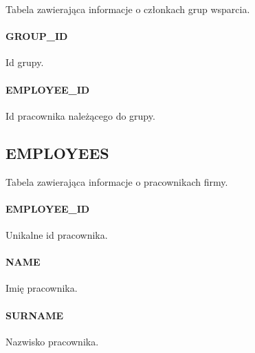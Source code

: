\documentclass[a4paper, oneside, 11pt]{report}
\begin{document}
Tabela zawierająca informacje o członkach grup wsparcia.

\paragraph{GROUP\_ID} Id grupy.
\paragraph{EMPLOYEE\_ID} Id pracownika należącego do grupy.

\subsection{EMPLOYEES}

Tabela zawierająca informacje o pracownikach firmy.

\paragraph{EMPLOYEE\_ID} Unikalne id pracownika.
\paragraph{NAME} Imię pracownika.
\paragraph{SURNAME} Nazwisko pracownika.
\end{document}
